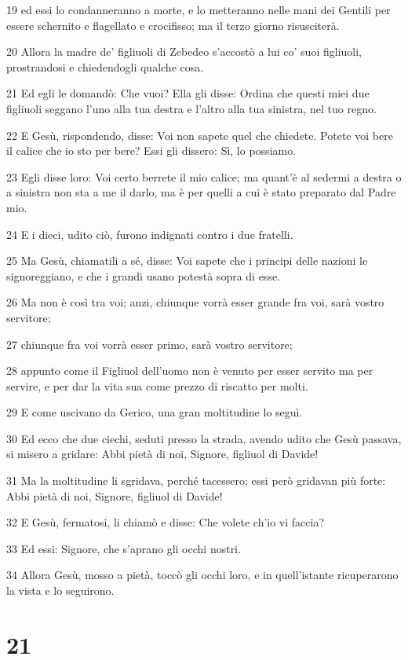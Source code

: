 \par 19 ed essi lo condanneranno a morte, e lo metteranno nelle mani dei Gentili per essere schernito e flagellato e crocifisso; ma il terzo giorno risusciterà.
\par 20 Allora la madre de' figliuoli di Zebedeo s'accostò a lui co' suoi figliuoli, prostrandosi e chiedendogli qualche cosa.
\par 21 Ed egli le domandò: Che vuoi? Ella gli disse: Ordina che questi miei due figliuoli seggano l'uno alla tua destra e l'altro alla tua sinistra, nel tuo regno.
\par 22 E Gesù, rispondendo, disse: Voi non sapete quel che chiedete. Potete voi bere il calice che io sto per bere? Essi gli dissero: Sì, lo possiamo.
\par 23 Egli disse loro: Voi certo berrete il mio calice; ma quant'è al sedermi a destra o a sinistra non sta a me il darlo, ma è per quelli a cui è stato preparato dal Padre mio.
\par 24 E i dieci, udito ciò, furono indignati contro i due fratelli.
\par 25 Ma Gesù, chiamatili a sé, disse: Voi sapete che i principi delle nazioni le signoreggiano, e che i grandi usano potestà sopra di esse.
\par 26 Ma non è così tra voi; anzi, chiunque vorrà esser grande fra voi, sarà vostro servitore;
\par 27 chiunque fra voi vorrà esser primo, sarà vostro servitore;
\par 28 appunto come il Figliuol dell'uomo non è venuto per esser servito ma per servire, e per dar la vita sua come prezzo di riscatto per molti.
\par 29 E come uscivano da Gerico, una gran moltitudine lo seguì.
\par 30 Ed ecco che due ciechi, seduti presso la strada, avendo udito che Gesù passava, si misero a gridare: Abbi pietà di noi, Signore, figliuol di Davide!
\par 31 Ma la moltitudine li sgridava, perché tacessero; essi però gridavan più forte: Abbi pietà di noi, Signore, figliuol di Davide!
\par 32 E Gesù, fermatosi, li chiamò e disse: Che volete ch'io vi faccia?
\par 33 Ed essi: Signore, che s'aprano gli occhi nostri.
\par 34 Allora Gesù, mosso a pietà, toccò gli occhi loro, e in quell'istante ricuperarono la vista e lo seguirono.

\chapter{21}

